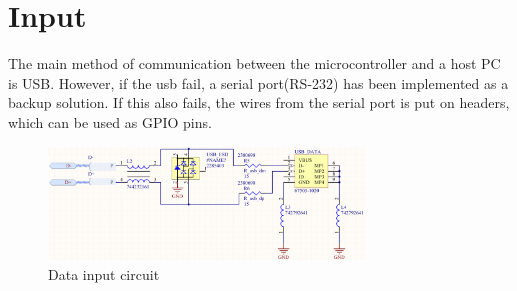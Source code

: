 \documentclass[../main/report.tex]{subfiles}
\begin{document}
\section{Input}

The main method of communication between the microcontroller and a host PC is USB.
However, if the usb fail, a serial port(RS-232) has been implemented as a backup solution.
If this also fails, the wires from the serial port is put on headers, which can be used as GPIO pins.

\begin{figure}[H]
		\centering
		\includegraphics[width=0.75\textwidth]{../pcb/assets/input.png}
		\caption{Data input circuit}
		\label{fig: input circuit}
\end{figure}
\end{document}
